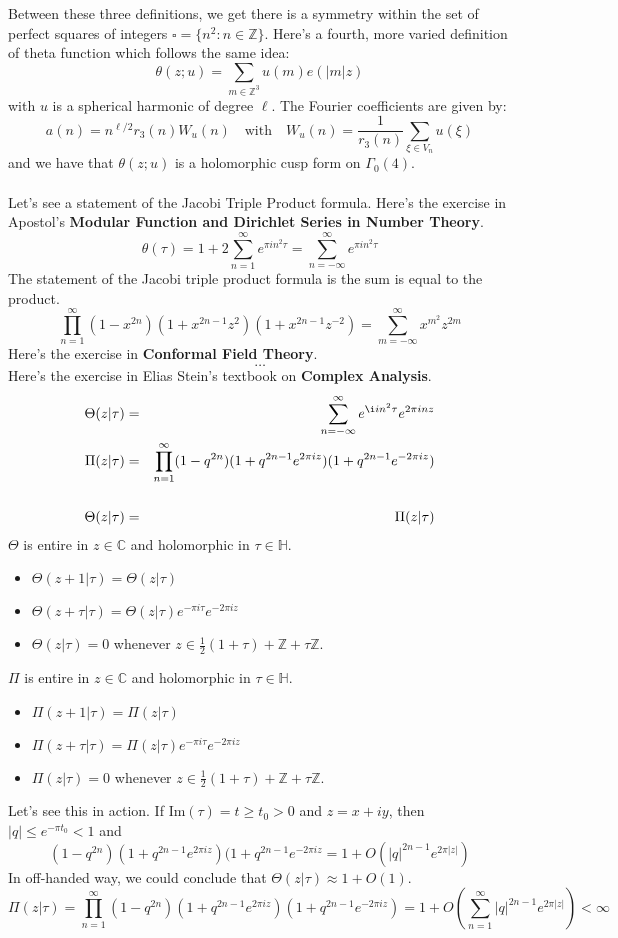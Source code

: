 \documentclass[12pt]{article}
\begin{document}
Between these three definitions, we get there is a symmetry within the set of perfect squares of integers $\square = \{ n^2 : n \in \mathbb{Z} \}$. 
\newpage \noindent
Here's a fourth, more varied definition of theta function which follows the same idea:
$$ \theta(z; u) = \sum_{m \in \mathbb{Z}^3} u(m) e(|m|z) $$
with $u$ is a spherical harmonic of degree $\ell$.  The Fourier coefficients are given by:
$$ a(n) = n^{\ell/2} r_3(n) W_u(n) \quad\text{with}\quad W_u(n) = \frac{1}{r_3(n)} \sum_{\xi \in V_n} u(\xi) $$ 
and we have that $\theta(z;u)$ is a holomorphic cusp form on $\Gamma_0(4)$.  \\ \\
Let's see a statement of the Jacobi Triple Product formula. Here's the exercise in Apostol's \textbf{Modular Function and Dirichlet Series in Number Theory}.  
$$ \theta(\tau) = 1 + 2\sum_{n=1}^\infty e^{\pi i n^2 \tau} = \sum_{n=-\infty}^\infty e^{\pi i n^2 \tau}  $$
The statement of the Jacobi triple product formula is the sum is equal to the product.
$$ \prod_{n=1}^\infty (1-x^{2n})(1+x^{2n-1}z^2)( 1+x^{2n-1} z^{-2}) =  \sum_{m = - \infty}^\infty x^{m^2} z^{2m} $$
Here's the exercise in \textbf{Conformal Field Theory}.  
$$ \dots $$
Here's the exercise in Elias Stein's textbook on \textbf{Complex Analysis}. 
\begin{eqnarray*}
\Theta(z|\tau) &=& \sum_{n=-\infty}^\infty e^{\i i n^2 \tau} e^{2\pi i n z} \\
\Pi(z|\tau) &=& \prod_{n=1}^\infty (1 - q^{2n}) (1 + q^{2n-1}e^{2\pi i z})(1 + q^{2n-1} e^{-2\pi i z}) \\ \\
\Theta(z|\tau) &=& \Pi (z|\tau) 
\end{eqnarray*}
$\Theta$ is entire in $z \in \mathbb{C}$ and holomorphic in $\tau \in \mathbb{H}$. 
\begin{itemize}
\item $\Theta(z+1|\tau) = \Theta(z|\tau) $
\item $\Theta(z+\tau|\tau) = \Theta(z|\tau) e^{- \pi i \tau} e^{-2\pi i z} $
\item $\Theta(z|\tau) = 0 $ whenever $z \in \frac{1}{2}(1 + \tau) + \mathbb{Z} + \tau \mathbb{Z} $.
\end{itemize} 
$\Pi$ is entire in $z \in \mathbb{C}$ and holomorphic in $\tau \in \mathbb{H}$. 
\begin{itemize}
\item $\Pi(z+1|\tau) = \Pi(z|\tau) $
\item $\Pi(z+\tau|\tau) = \Pi(z|\tau) e^{-\pi i \tau}e^{-2\pi i z } $
\item $\Pi(z|\tau) = 0$ whenever $z \in \frac{1}{2}(1 + \tau) + \mathbb{Z} + \tau \mathbb{Z}$. 
\end{itemize}
Let's see this in action.  If $\text{Im}(\tau) = t \geq t_0 > 0$ and $z = x + iy$, then $|q| \leq e^{- \pi t_0} < 1$ and 
$$ (1 - q^{2n}) ( 1 + q^{2n-1} e^{2\pi i z} )(1 + q^{2n-1} e^{- 2\pi i z} = 1 + O( |q|^{2n-1} e^{2\pi |z|}) $$
In off-handed way, we could conclude that $\Theta(z|\tau) \approx 1 + O(1)$. 
$$ \Pi(z|\tau) = \prod_{n=1}^\infty (1 - q^{2n}) (1 + q^{2n-1}e^{2\pi i z})(1 + q^{2n-1} e^{-2\pi i z}) = 1 + O\left( \sum_{n=1}^\infty  |q|^{2n-1}e^{2\pi |z|}\right)  < \infty$$
\end{document}
